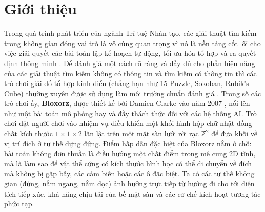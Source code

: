 \section{Giới thiệu}
\label{sec:introduction}

Trong quá trình phát triển của ngành Trí tuệ Nhân tạo, các giải thuật
tìm kiếm trong không gian đóng vai trò là vô cùng quan trọng
vì nó là nền tảng cốt lõi cho việc giải quyết các bài toán lập kế hoạch
tự động, tối ưu hóa tổ hợp và ra quyết định thông minh
\cite{russell2020aima, edelkamp2011heuristic}.
Để đánh giá một cách rõ ràng và đầy đủ cho phần hiệu năng của các giải
thuật tìm kiếm không có thông tin và tìm kiếm có thông tin thì các trò chơi
giải đố tổ hợp kinh điển (chẳng hạn như 15-Puzzle, Sokoban, Rubik's Cube)
thường xuyên được sử dụng làm môi trường chuẩn đánh giá
\cite{pearl1984heuristics, sturtevant2012benchmarks}.
Trong số các trò chơi ấy, \textbf{Bloxorz}, được thiết
kế bởi Damien Clarke vào năm 2007 \cite{clarke2007bloxorz}, nổi lên như
một bài toán mô phỏng hay và đầy thách thức đối với các hệ thống AI.
Trò chơi đặt người chơi vào nhiệm vụ điều khiển một khối hình hộp chữ nhật
đồng chất kích thước $1 \times 1 \times 2$ lăn lật trên một mặt sàn lưới
rời rạc $\mathbb{Z}^2$ để đưa khối về vị trí đích ở tư thế dựng đứng.
Điểm hấp dẫn đặc biệt của Bloxorz nằm ở chỗ: bài toán không đơn thuần là
điều hướng một chất điểm trong mê cung 2D tĩnh, mà là làm sao để 
vật thể cứng có kích thước hình học có thể di chuyển về đích mà không bị
gặp bẫy, các cảm biến hoặc các ô đặc biệt. Ta có các tư thế không gian (đứng,
nằm ngang, nằm dọc) ảnh hưởng trực tiếp từ hướng đi cho tới diện tích tiếp xúc,
khả năng chịu tải của bề mặt sàn và các cơ chế kích hoạt tương tác phức tạp.

